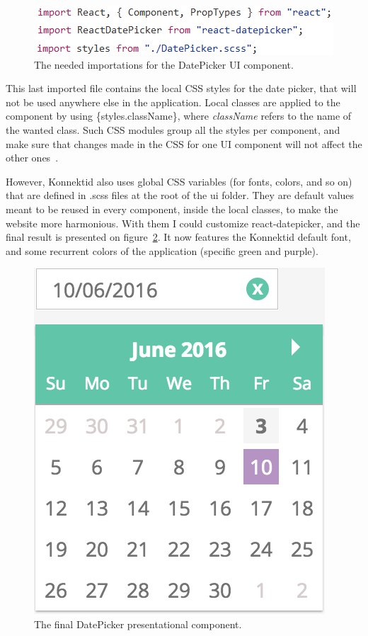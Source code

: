 \begin{figure}[H]
    \centering
    \includegraphics[scale=0.9]{figure/imports.png}
    \caption{The needed importations for the DatePicker UI component.}
    \label{fig:imports}
\end{figure}

This last imported file contains the local CSS styles for the date picker, that will not be used anywhere else in the application. Local classes are applied to the component by using \{styles.className\}, where \textit{className} refers to the name of the wanted class. Such CSS modules group all the styles per component, and make sure that changes made in the CSS for one UI component will not affect the other ones~\cite{localCSS}.

However, Konnektid also uses global CSS variables (for fonts, colors, and so on) that are defined in .scss files at the root of the ui folder. They are default values meant to be reused in every component, inside the local classes, to make the website more harmonious. With them I could customize react-datepicker, and the final result is presented on {\sc figure}~\ref{fig:datePicker}. It now features the Konnektid default font, and some recurrent colors of the application (specific green and purple).

\begin{figure}[H]
    \centering
    \includegraphics[scale=0.6]{figure/datePicker.png}
    \caption{The final DatePicker presentational component.}
    \label{fig:datePicker}
\end{figure}

